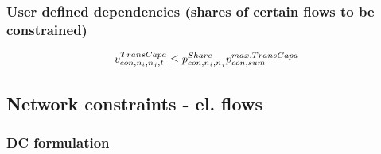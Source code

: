 \subsubsection{User defined dependencies (shares of certain flows to be constrained)}

\begin{align} \label{eq:transconstraints1}
	&\vTranCapa \leq p^{Share}_{con,n_i,n_j} \pMaxTransCapa[con,sum]\\  %
\end{align}

\subsection{Network constraints - el. flows}
\subsubsection{DC formulation}




